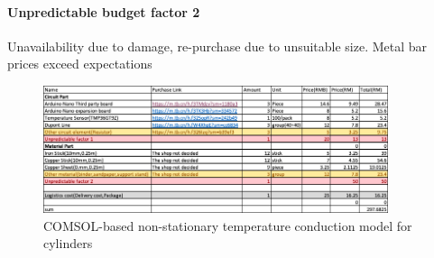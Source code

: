 \documentclass[a4paper,12pt]{article}
\begin{document}
\paragraph{Unpredictable budget factor 2} Unavailability due to damage, re-purchase due to unsuitable size. Metal bar prices exceed expectations


\begin{figure}[H] %
\centering %
\includegraphics[width=0.9\textwidth]{budget.png} %
\caption{COMSOL-based non-stationary temperature conduction model for cylinders} %
\end{figure}






 
\end{document}
